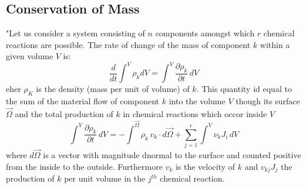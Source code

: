 \subsection{Conservation of Mass}

"Let us consider a system consisting of $n$ components amongst which $r$ chemical reactions are possible. 
The rate of change of the mass of component $k$ within a given volume $V$ is:
\begin{equation}
\frac{d}{dt}\int^V \rho_k dV = \int^V \frac{\partial \rho_k}{\partial t}\, dV
\label{dGM1}
\end{equation}
eher $\rho_K$ is the density (mass per unit of volume) of $k$. This quantity id equal to the sum of the material flow of component $k$ into the volume $V$ though its surface $\vec{\Omega}$ and the total production of $k$ in chemical reactions which occor inside $V$
\begin{equation}
\int^V \frac{\partial \rho_k}{\partial t}\, dV = - \int^\vec{\Omega} \rho_k\, v_k \cdot d\vec{\Omega} + \sum_{j=1}^r \int^V \nu_k J_i\, dV
\label{dGM2}
\end{equation}
where $d\vec{\Omega}$ is a vector with magnitude d\Omega normal to the surface and counted positive from the inside to the outside. Furthermore $v_k$ is the velocity of $k$ and $v_{kj} J_j$  the production of $k$ per unit volume in the $j^{th}$ chemical reaction.  
